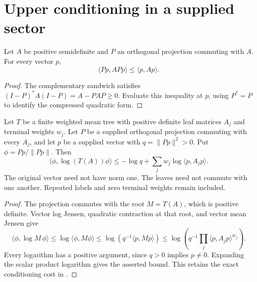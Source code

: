\section{Upper conditioning in a supplied sector}
\label{sec:mean_tree_supplied_projection_upper}


\begin{theorem}
    \label{thm:commuting_projection_quadratic_upper}
    \leanok
    Let $A$ be positive semidefinite and $P$ an orthogonal projection
    commuting with $A$. For every vector $p$,
    \[
        \langle Pp,APp\rangle\leq\langle p,Ap\rangle.
    \]
\end{theorem}
\begin{proof}
    \leanok
    The complementary sandwich satisfies
    $(I-P)^*A(I-P)=A-PAP\geq0$. Evaluate this inequality at $p$,
    using $P^*=P$ to identify the compressed quadratic form.
\end{proof}

\begin{theorem}
    \label{thm:mean_tree_supplied_projection_upper}
    \leanok
    Let $T$ be a finite weighted mean tree with positive definite leaf
    matrices $A_j$ and terminal weights $w_j$. Let $P$ be a supplied
    orthogonal projection commuting with every $A_j$, and let $p$ be
    a supplied vector with $q=\|Pp\|^2>0$. Put $\phi=Pp/\|Pp\|$.
    Then
    \[
        \langle\phi,\log(T(A))\phi\rangle
        \leq-\log q+\sum_jw_j\log\langle p,A_jp\rangle.
    \]
    The original vector need not have norm one. The leaves need not
    commute with one another. Repeated labels and zero terminal weights
    remain included.
\end{theorem}
\begin{proof}
    \leanok
    The projection commutes with the root $M=T(A)$, which is positive
    definite. Vector log Jensen, quadratic contraction at that root,
    and vector mean Jensen give
    \[
        \langle\phi,\log M\,\phi\rangle
        \leq\log\langle\phi,M\phi\rangle
        \leq\log\left(q^{-1}\langle p,Mp\rangle\right)
        \leq\log\left(q^{-1}
            \prod_j\langle p,A_jp\rangle^{w_j}\right).
    \]
    Every logarithm has a positive argument, since $q>0$ implies $p\ne0$.
    Expanding the scalar product logarithm gives the asserted bound.
    This retains the exact conditioning cost in
    \cite[Section~8]{OpenAI2026AreaLaw}.
\end{proof}

